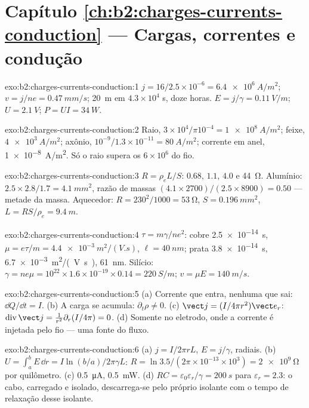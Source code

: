 \section*{Capítulo \ref{ch:b2:charges-currents-conduction} --- Cargas, correntes e condução}

\begin{solution}{exo:b2:charges-currents-conduction:1}
$j = 16/2.5 \times 10^{-6} = \qty{6.4e6}{A/m^2}$; $v = j/ne = \qty{0.47}{mm/s}$; \qty{20}{m}
em $4.3 \times 10^4$ s, doze horas. $E = j/\gamma = \qty{0.11}{V/m}$; $U = \qty{2.1}{V}$;
$P = UI = \qty{34}{W}$.
\end{solution}

\begin{solution}{exo:b2:charges-currents-conduction:2}
Raio, $3 \times 10^4/\pi10^{-4} = \qty{1e8}{A/m^2}$; feixe, $\qty{4e3}{A/m^2}$; axônio,
$10^{-9}/1.3 \times 10^{-11} = \qty{80}{A/m^2}$; corrente em anel, \qty{1e-8}{A/m^2}. Só o
raio supera os $6 \times 10^6$ do fio.
\end{solution}

\begin{solution}{exo:b2:charges-currents-conduction:3}
$R = \rho_eL/S$: $0.68$, $1.1$, $4.0$ e \qty{44}{\ohm}. Alumínio: $2.5 \times 2.8/1.7 =
\qty{4.1}{mm^2}$, razão de massas $(4.1 \times 2700)/(2.5 \times 8900) = 0.50$ --- metade da massa.
Aquecedor: $R = 230^2/1000 = \qty{53}{\ohm}$, $S = \qty{0.196}{mm^2}$, $L = RS/\rho_e = \qty{9.4}{m}$.
\end{solution}

\begin{solution}{exo:b2:charges-currents-conduction:4}
$\tau = m\gamma/ne^2$: cobre \qty{2.5e-14}{s}, $\mu = e\tau/m = \qty{4.4e-3}{m^2/(V.s)}$,
$\ell = \qty{40}{nm}$; prata \qty{3.8e-14}{s}, \qty{6.7e-3}{m^2/(V.s)}, \qty{61}{nm}.
Silício: $\gamma = ne\mu = 10^{22} \times 1.6 \times 10^{-19} \times 0.14 = \qty{220}{S/m}$; $v =
\mu E = \qty{140}{m/s}$.
\end{solution}

\begin{solution}{exo:b2:charges-currents-conduction:5}
(a) Corrente que entra, nenhuma que sai: $\dd Q/\dd t = I$. (b) A carga se acumula: $\partial_t
\rho \ne 0$. (c) $\vect j = (I/4\pi r^2)\vect e_r$: $\operatorname{div}\vect j = \frac1{r^2}
\partial_r(I/4\pi) = 0$. (d) Somente no eletrodo, onde a corrente é
injetada pelo fio --- uma fonte do fluxo.
\end{solution}

\begin{solution}{exo:b2:charges-currents-conduction:6}
(a) $j = I/2\pi rL$, $E = j/\gamma$, radiais. (b) $U = \int_a^bE\,\dd r = I\ln(b/a)/
2\pi\gamma L$: $R = \ln3.5/(2\pi \times 10^{-13} \times 10^3) = \qty{2e9}{\ohm}$ por quilômetro.
(c) \qty{0.5}{\micro A}, \qty{0.5}{mW}. (d) $RC = \varepsilon_0\varepsilon_r/\gamma = \qty{200}{s}$ para
$\varepsilon_r = 2.3$: o cabo, carregado e isolado, descarrega-se pelo próprio
isolante com o tempo de relaxação desse isolante.
\end{solution}

